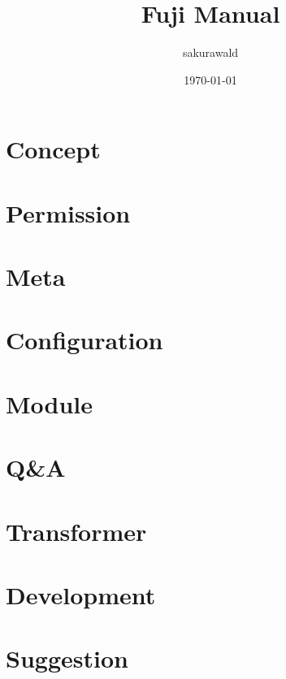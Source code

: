 \documentclass[10pt,oneside]{book}
\begin{document}
    \title{Fuji Manual}
    \author{sakurawald}
    \date{\today\\\version}

    \maketitle
    \tableofcontents


    \mainmatter


    \chapter{Concept}\label{ch:concept}
    


    \chapter{Permission}\label{ch:permission}
    


    \chapter{Meta}\label{ch:meta}
    


    \chapter{Configuration}\label{ch:configuration}
    


    \chapter{Module}\label{ch:module}
    


    \chapter{Q\&A}\label{ch:q&a}
    


    \chapter{Transformer}\label{ch:transformer}
    


    \chapter{Development}\label{ch:development}
    


    \chapter{Suggestion}\label{ch:suggestion}
    
\end{document}
